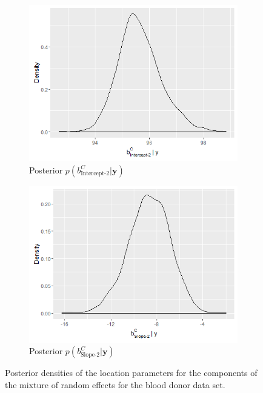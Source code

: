 \begin{figure}[!htb]
	\begin{subfigure}[b]{0.4\textwidth}
		\includegraphics[width=\textwidth]{mainmatter/chapter_6_blood_donor/b21.png}	
          \caption{\label{fig : mu_blood_donor_21}Posterior $p(b_\text{Intercept-2}^C|\boldsymbol{y})$}
	\end{subfigure}	
	\begin{subfigure}[b]{0.4\textwidth}
		\includegraphics[width=\textwidth]{mainmatter/chapter_6_blood_donor/b22.png}	
          \caption{\label{fig : mu_blood_donor_22}Posterior $p(b_\text{Slope-2}^C|\boldsymbol{y})$}
	\end{subfigure}	
	\caption{Posterior densities of the location parameters for the components of the mixture of random effects for the blood donor data set.}
	\label{fig : mu_blood_donor}    
\end{figure} 

